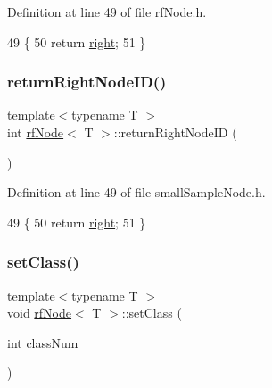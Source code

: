 Definition at line 49 of file rf\+Node.\+h.


\begin{DoxyCode}
49                                       \{
50             \textcolor{keywordflow}{return} \hyperlink{classrfNode_a01e57d43ac8af60d16880544e99ed965}{right};
51         \}
\end{DoxyCode}
\mbox{\label{classrfNode_aef5c965bd9810b3573057d611dcca7f5}} 
\subsubsection{\texorpdfstring{return\+Right\+Node\+I\+D()}{returnRightNodeID()}\hspace{0.1cm}{\footnotesize\ttfamily [2/2]}}
{\footnotesize\ttfamily template$<$typename T $>$ \\
int \hyperlink{classrfNode}{rf\+Node}$<$ T $>$\+::return\+Right\+Node\+ID (\begin{DoxyParamCaption}{ }\end{DoxyParamCaption})\hspace{0.3cm}{\ttfamily [inline]}}



Definition at line 49 of file small\+Sample\+Node.\+h.


\begin{DoxyCode}
49                                       \{
50             \textcolor{keywordflow}{return} \hyperlink{classrfNode_a01e57d43ac8af60d16880544e99ed965}{right};
51         \}
\end{DoxyCode}
\mbox{\label{classrfNode_a61c8f87f97999e0123a1f4655ffedd15}} 
\subsubsection{\texorpdfstring{set\+Class()}{setClass()}\hspace{0.1cm}{\footnotesize\ttfamily [1/2]}}
{\footnotesize\ttfamily template$<$typename T $>$ \\
void \hyperlink{classrfNode}{rf\+Node}$<$ T $>$\+::set\+Class (\begin{DoxyParamCaption}\item[{int}]{class\+Num }\end{DoxyParamCaption})\hspace{0.3cm}{\ttfamily [inline]}}



